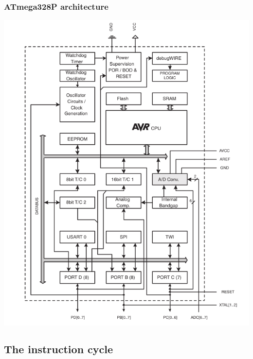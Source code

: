 \documentclass[aspectratio=169]{beamer}
\begin{document}
\begin{frame}
  \frametitle{ATmega328P architecture}
  \centering
  \includegraphics[height=0.9\textheight]{assets/328p_uarch.png}
\end{frame}

\subsection{The instruction cycle}
\end{document}
